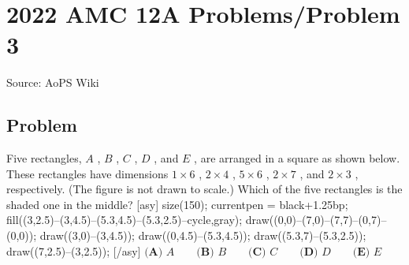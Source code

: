 \documentclass[12pt]{article}
\begin{document}
\section*{{2022 AMC 12A Problems/Problem 3}}
Source: AoPS Wiki

\subsection*{Problem}
Five rectangles, $A$ , $B$ , $C$ , $D$ , and $E$ , are arranged in a square as shown below. These rectangles have dimensions $1\times6$ , $2\times 4$ , $5\times6$ , $2\times7$ , and $2\times3$ , respectively. (The figure is not drawn to scale.) Which of the five rectangles is the shaded one in the middle? [asy] size(150); currentpen = black+1.25bp; fill((3,2.5)--(3,4.5)--(5.3,4.5)--(5.3,2.5)--cycle,gray); draw((0,0)--(7,0)--(7,7)--(0,7)--(0,0)); draw((3,0)--(3,4.5)); draw((0,4.5)--(5.3,4.5)); draw((5.3,7)--(5.3,2.5)); draw((7,2.5)--(3,2.5)); [/asy] $\textbf{(A) }A\qquad\textbf{(B) }B \qquad\textbf{(C) }C \qquad\textbf{(D) }D\qquad\textbf{(E) }E$
\end{document}
